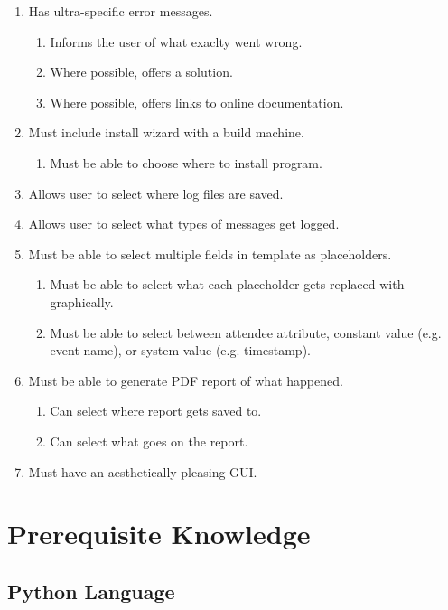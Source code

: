 \documentclass[11pt]{article}
\begin{document}
\begin{enumerate}
    \item Has ultra-specific error messages.
    \begin{enumerate}
        \item Informs the user of what exaclty went wrong.
        \item Where possible, offers a solution.
        \item Where possible, offers links to online documentation.
    \end{enumerate}
    \item Must include install wizard with a build machine.
    \begin{enumerate}
        \item Must be able to choose where to install program.
    \end{enumerate}
    \item Allows user to select where log files are saved.
    \item Allows user to select what types of messages get logged.
    \item Must be able to select multiple fields in template as placeholders.
    \begin{enumerate}
        \item Must be able to select what each placeholder gets replaced with graphically.
        \item Must be able to select between attendee attribute, constant value (e.g. event name), or system value (e.g. timestamp).
    \end{enumerate}
    \item Must be able to generate PDF report of what happened.
    \begin{enumerate}
        \item Can select where report gets saved to.
        \item Can select what goes on the report.
    \end{enumerate}
    \item Must have an aesthetically pleasing GUI.
\end{enumerate}

\newpage

\section{Prerequisite Knowledge}

\subsection{Python Language}
\end{document}
